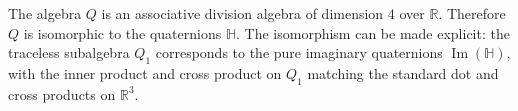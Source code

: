 The algebra $Q$ is an associative division algebra of dimension $4$ over $\mathbb{R}$. Therefore $Q$ is isomorphic to the quaternions $\mathbb{H}$. The isomorphism can be made explicit: the traceless subalgebra $Q_1$ corresponds to the pure imaginary quaternions $\operatorname{Im}(\mathbb{H})$, with the inner product and cross product on $Q_1$ matching the standard dot and cross products on $\mathbb{R}^3$.
